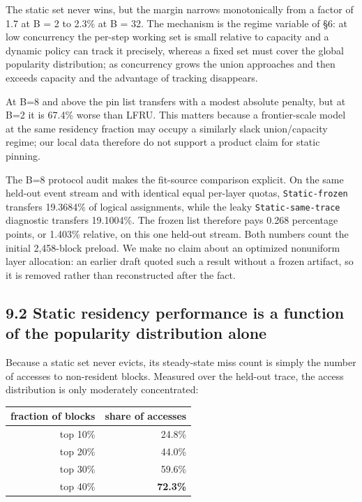 \documentclass[
  10pt,
  letterpaper,
  10pt]{article}
\newcounter{none} %
\begin{document}
The static set never wins, but the margin narrows monotonically from a
factor of 1.7 at B = 2 to 2.3\% at B = 32. The mechanism is the regime
variable of §6: at low concurrency the per-step working set is small
relative to capacity and a dynamic policy can track it precisely,
whereas a fixed set must cover the global popularity distribution; as
concurrency grows the union approaches and then exceeds capacity and the
advantage of tracking disappears.

At B=8 and above the pin list transfers with a modest absolute penalty,
but at B=2 it is 67.4\% worse than LFRU. This matters because a
frontier-scale model at the same residency fraction may occupy a
similarly slack union/capacity regime; our local data therefore do not
support a product claim for static pinning.

The B=8 protocol audit makes the fit-source comparison explicit. On the
same held-out event stream and with identical equal per-layer quotas,
\texttt{Static-frozen} transfers 19.3684\% of logical assignments, while
the leaky \texttt{Static-same-trace} diagnostic transfers 19.1004\%. The
frozen list therefore pays 0.268 percentage points, or 1.403\% relative,
on this one held-out stream. Both numbers count the initial 2,458-block
preload. We make no claim about an optimized nonuniform layer
allocation: an earlier draft quoted such a result without a frozen
artifact, so it is removed rather than reconstructed after the fact.

\subsection{9.2 Static residency performance is a function of the
popularity distribution
alone}\label{static-residency-performance-is-a-function-of-the-popularity-distribution-alone}

Because a static set never evicts, its steady-state miss count is simply
the number of accesses to non-resident blocks. Measured over the
held-out trace, the access distribution is only moderately concentrated:

{\def\LTcaptype{none} %
\begin{longtable}[]{@{}rr@{}}
\toprule\noalign{}
fraction of blocks & share of accesses \\
\midrule\noalign{}
\endhead
\bottomrule\noalign{}
\endlastfoot
top 10\% & 24.8\% \\
top 20\% & 44.0\% \\
top 30\% & 59.6\% \\
top 40\% & \textbf{72.3\%} \\
\end{longtable}
}
\end{document}
